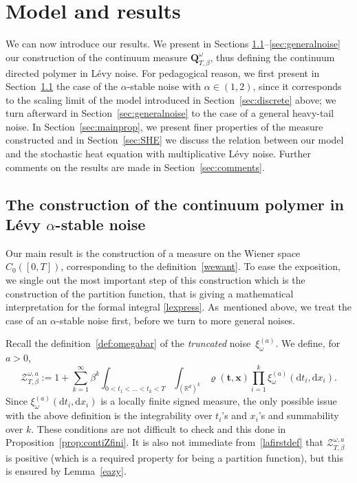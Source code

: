 \documentclass[11pt]{article}
\newcommand{\Subsection}{\subsection}
\numberwithin{equation}{section}
\let\mathcal\mathscr
\theoremstyle{definition}
\newcommand{\bt}{\boldsymbol{t}}
\newcommand{\bx}{\boldsymbol{x}}
\newcommand{\dd}{\mathrm{d}}
\newcommand{\cZ}{{\ensuremath{\mathcal Z}} }
\newcommand{\bQ}{{\ensuremath{\mathbf Q}} }
\newcommand{\bbR}{{\ensuremath{\mathbb R}} }
\let\ga\alpha
\let\gb\beta
\let\go\omega
\begin{document}
\section{Model and results}

We can now introduce our results. We present in Sections \ref{sec:mainres}--\ref{sec:generalnoise} our construction of the continuum measure $\bQ_{T,\gb}^{\go}$,
thus defining the continuum directed polymer in Lévy noise.
For pedagogical reason, we first present in Section~\ref{sec:mainres} the case of the $\alpha$-stable noise with $\ga\in (1,2)$, since it corresponds
to the scaling limit of the model introduced in Section~\ref{sec:discrete} above;
we turn afterward in Section~\ref{sec:generalnoise} to the case of a general heavy-tail noise.
In Section~\ref{sec:mainprop},
we present finer properties of the
measure constructed
and
in Section~\ref{sec:SHE} we discuss the
relation between our model
and the stochastic heat equation with multiplicative Lévy noise.
Further comments on the results are
made in Section~\ref{sec:comments}.

\Subsection{The construction of the continuum polymer in Lévy $\alpha$-stable noise}
\label{sec:mainres}

Our main result is the construction of a measure on the Wiener space $C_0([0,T])$,
corresponding to the definition~\eqref{wewant}.
To ease the exposition, we single out the most important step of this construction which is the construction of the partition function,
that is giving a mathematical interpretation for the formal integral \eqref{lexpress}.
As~mentioned above, we treat the case of an $\alpha$-stable noise first,
before we turn to more general noises.

Recall the definition~\eqref{def:omegabar}
of the \textit{truncated} noise~$\xi_{\go}^{(a)}$.
We define, for $a>0$,
\begin{equation}\label{lafirstdef}
\cZ^{\go,a}_{T,\beta}:=1+\sum_{k=1}^\infty \beta^k\int_{0<t_1<\dots<t_k<T}\int_{(\bbR^d)^k} \varrho(\bt,\bx) \prod_{i=1}^k \xi_{\go}^{(a)} (\dd t_i, \dd x_i).
\end{equation}
Since $\xi_{\go}^{(a)} (\dd t_i, \dd x_i)$ is a locally finite signed measure, the only possible issue with the above definition is the integrability over $t_i$'s and $x_i$'s and summability over $k$. These conditions are not difficult to check and this done in Proposition~\ref{prop:contiZfini}.
It is also not immediate from~\eqref{lafirstdef} that
$\cZ^{\go,a}_{T,\beta}$ is positive (which is a required property for being a partition function), but this is ensured by Lemma~\ref{eazy}.
\end{document}
